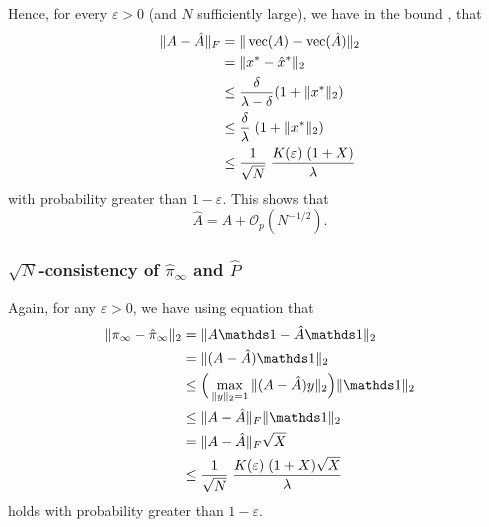 \documentclass[journal]{IEEEtran}
\begin{document}
Hence, for every $\varepsilon > 0$ (and $N$ sufficiently large), we have in the
bound , that
\begin{align}
    \|A - \hat A\|_F &= \|\vec{A} - \vec{\hat A}\|_2 \notag \\
                     &= \|x^* - \hat x^*\|_2 \notag \\
                     &\leq \frac{\delta}{\lambda - \delta} (1 + \|x^*\|_2) \notag \\
                     &\leq \frac{\delta}{\lambda} \; (1 + \|x^*\|_2) \notag \\
                     &\leq \frac{1}{\sqrt{N}} \; \frac{K(\varepsilon) \; (1
+ X)}{\lambda}
    \label{eq:A_hatA_bound}
\end{align}
with probability greater than $1 - \varepsilon$. This shows that
\begin{equation}
    \hat A = A + \mathcal{O}_p(N^{-1/2}).
\end{equation}

\subsubsection{$\sqrt{N}$-consistency of $\hat \pi_\infty$ and $\hat P$}
\label{ssec:error_propagation}

Again, for any $\varepsilon > 0$, we have using equation  that
\begin{align}
    \|\pi_\infty - \hat \pi_\infty \|_2 &= \| A\ones - \hat A \ones \|_2 \notag \\
                                        &= \| (A - \hat A) \ones \|_2 \notag \\
                                        &\leq \Big(\max_{\|y\|_2 = 1} \|(A-\hat A)y\|_2\Big) \|\ones\|_2 \notag \\
                                        &\leq \|A-\hat A\|_F \|\ones\|_2 \notag \\
                                        &= \|A-\hat A\|_F \sqrt{X} \notag \\
                                        &\leq \frac{1}{\sqrt{N}} \; \frac{K(\varepsilon) \; (1
+ X)\sqrt{X}}{\lambda}
\label{eq:pi_hatPi_bound}
\end{align}
holds with probability greater than $1-\varepsilon$.
\end{document}
